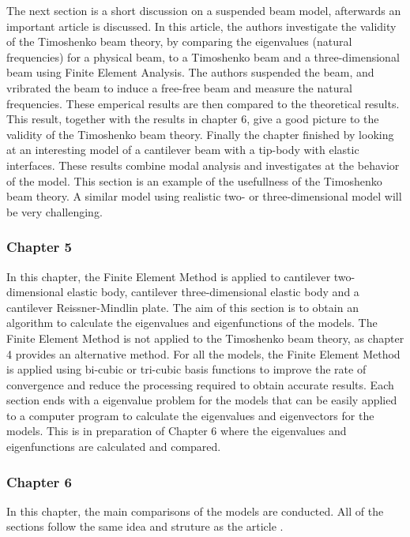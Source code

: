 \documentclass[../main.tex]{subfiles}
\begin{document}
The next section is a short discussion on a suspended beam model, afterwards an important article \cite{SP06} is discussed. In this article, the authors investigate the validity of the Timoshenko beam theory, by comparing the eigenvalues (natural frequencies) for a physical beam, to a Timoshenko beam and a three-dimensional beam using Finite Element Analysis. The authors suspended the beam, and vribrated the beam to induce a free-free beam and measure the natural frequencies. These emperical results are then compared to the theoretical results. This result, together with the results in chapter 6, give a good picture to the validity of the Timoshenko beam theory. Finally the chapter finished by looking at an interesting model of a cantilever beam with a tip-body with elastic interfaces. These results combine modal analysis and investigates at the behavior of the model. This section is an example of the usefullness of the Timoshenko beam theory. A similar model using realistic two- or three-dimensional model will be very challenging.

\subsubsection{Chapter 5}
In this chapter, the Finite Element Method is applied to cantilever two-dimensional elastic body, cantilever three-dimensional elastic body and a cantilever Reissner-Mindlin plate. The aim of this section is to obtain an algorithm to calculate the eigenvalues and eigenfunctions of the models. The Finite Element Method is not applied to the Timoshenko beam theory, as chapter 4 provides an alternative method. For all the models, the Finite Element Method is applied using bi-cubic or tri-cubic basis functions to improve the rate of convergence and reduce the processing required to obtain accurate results. Each section ends with a eigenvalue problem for the models that can be easily applied to a computer program to calculate the eigenvalues and eigenvectors for the models. This is in preparation of Chapter 6 where the eigenvalues and eigenfunctions are calculated and compared.

\subsubsection{Chapter 6}
In this chapter, the main comparisons of the models are conducted. All of the sections follow the same idea and struture as the article \cite{LVV09}.
\end{document}
